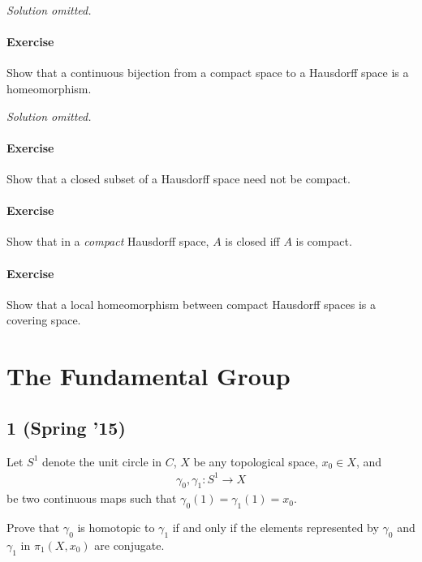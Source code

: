 \emph{Solution omitted.}

\hypertarget{exercise-43}{%
\paragraph{Exercise}\label{exercise-43}}

Show that a continuous bijection from a compact space to a Hausdorff
space is a homeomorphism.

\emph{Solution omitted.}

\hypertarget{exercise-44}{%
\paragraph{Exercise}\label{exercise-44}}

Show that a closed subset of a Hausdorff space need not be compact.

\hypertarget{exercise-45}{%
\paragraph{Exercise}\label{exercise-45}}

Show that in a \emph{compact} Hausdorff space, \(A\) is closed iff \(A\)
is compact.

\hypertarget{exercise-46}{%
\paragraph{Exercise}\label{exercise-46}}

Show that a local homeomorphism between compact Hausdorff spaces is a
covering space.

\hypertarget{the-fundamental-group}{%
\section{The Fundamental Group}\label{the-fundamental-group}}

\hypertarget{spring-15-3}{%
\subsection{1 (Spring '15)}\label{spring-15-3}}

\begin{problem}[?]

Let \(S^1\) denote the unit circle in \(C\), \(X\) be any topological
space, \(x_0 \in X\), and
\begin{align*}\gamma_0, \gamma_1 : S^1 \to X\end{align*}
be two continuous maps such that \(\gamma_0 (1) = \gamma_1 (1) = x_0\).

Prove that \(\gamma_0\) is homotopic to \(\gamma_1\) if and only if the
elements represented by \(\gamma_0\) and \(\gamma_1\) in
\(\pi_1 (X, x_0 )\) are conjugate.

\end{problem}

